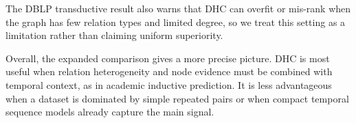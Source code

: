 The DBLP transductive result also warns that DHC can overfit or mis-rank when the graph has few relation types and limited degree, so we treat this setting as a limitation rather than claiming uniform superiority.
\begin{table}[t]
\centering
\caption{MRR result for transductive temporal link prediction.The best result is in bold, and the second best is underlined.}
\label{tab:transductive_mrr}
\scriptsize
\setlength{\tabcolsep}{4pt}
\end{table}

Overall, the expanded comparison gives a more precise picture. 
DHC is most useful when relation heterogeneity and node evidence must be combined with temporal context, as in academic inductive prediction. 
It is less advantageous when a dataset is dominated by simple repeated pairs or when compact temporal sequence models already capture the main signal.
